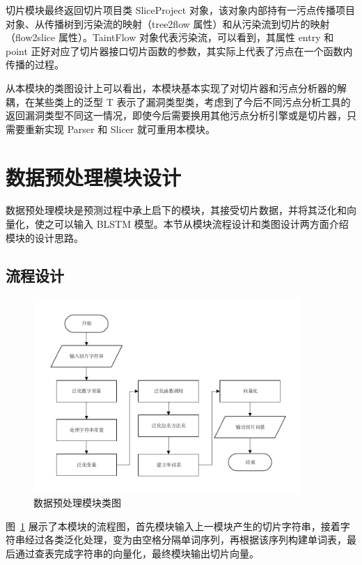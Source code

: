 切片模块最终返回切片项目类 SliceProject 对象，该对象内部持有一污点传播项目对象、从传播树到污染流的映射（tree2flow 属性）和从污染流到切片的映射（flow2slice 属性）。TaintFlow 对象代表污染流，可以看到，其属性 entry 和 point 正好对应了切片器接口切片函数的参数，其实际上代表了污点在一个函数内传播的过程。

从本模块的类图设计上可以看出，本模块基本实现了对切片器和污点分析器的解耦，在某些类上的泛型 T 表示了漏洞类型类，考虑到了今后不同污点分析工具的返回漏洞类型不同这一情况，即使今后需要换用其他污点分析引擎或是切片器，只需要重新实现 Parser 和 Slicer 就可重用本模块。

\section{数据预处理模块设计}

数据预处理模块是预测过程中承上启下的模块，其接受切片数据，并将其泛化和向量化，使之可以输入 BLSTM 模型。本节从模块流程设计和类图设计两方面介绍模块的设计思路。

\subsection{流程设计}

\begin{figure}[!htb]
    \centering
    \includegraphics[width=0.9\textwidth]{FIGs/chapter3/preProcessing.pdf}
    \caption{数据预处理模块类图}\label{preProcessing}
\end{figure}

图~\ref{preProcessing} 展示了本模块的流程图，首先模块输入上一模块产生的切片字符串，接着字符串经过各类泛化处理，变为由空格分隔单词序列，再根据该序列构建单词表，最后通过查表完成字符串的向量化，最终模块输出切片向量。

